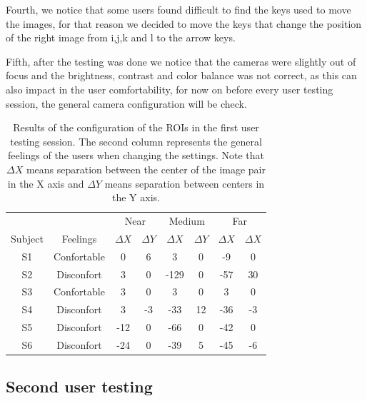 \documentclass[10pt,a4paper,twocolumn,twoside]{article}
\begin{document}
	Fourth, we notice that some users found difficult to find the keys used to move the images, for that reason we decided to move the keys that change the position of the right image from i,j,k and l to the arrow keys. 
	
	Fifth, after the testing was done we notice that the cameras were slightly out of focus and the brightness, contrast and color balance was not correct, as this can also impact in the user comfortability, for now on before every user testing session, the general camera configuration will be check.
	
	
	\begin{table}
		\begin{center}
			\begin{tabular}{cccccccc}
				\toprule
				& & \multicolumn{2}{c}{Near} & \multicolumn{2}{c}{Medium} & \multicolumn{2}{c}{Far} \\ 
				Subject &Feelings & $\Delta X$ & $\Delta Y$ & $\Delta X$ & $\Delta Y$ & $\Delta X$ & $\Delta X$ \\ 
				\midrule
				S1&Confortable & 0 & 6 & 3 & 0 & -9 & 0 \\ 
				\midrule 
				S2&Disconfort & 3 & 0 & -129 & 0 & -57 & 30 \\ 
				\midrule
				S3&Confortable & 3 & 0 & 3 & 0 & 3 & 0 \\ 
				\midrule 
				S4&Disconfort & 3 & -3 & -33 & 12 & -36 & -3 \\ 
				\midrule
				S5&Disconfort & -12 & 0 & -66 & 0 & -42 & 0 \\ 
				\midrule
				S6&Disconfort & -24 & 0 & -39 & 5 & -45 & -6 \\ 
				\bottomrule
			\end{tabular} 
			\caption{Results of the configuration of the ROIs in the first user testing session. The second column represents the general feelings of the users when changing the settings. Note that $\Delta X$ means separation between the center of the image pair in the X axis and $\Delta Y$ means separation between centers in the Y axis.}
			\label{tab:firstUserTestResults}
		\end{center}
	\end{table}
	
	
	\subsection{Second user testing}
	
\end{document}

